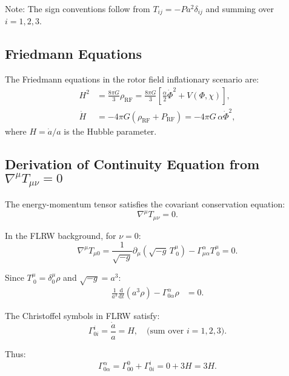 \documentclass[11pt,a4paper]{article}
\numberwithin{equation}{section}
\theoremstyle{plain}
\theoremstyle{definition}
\theoremstyle{remark}
\newcommand{\dd}{\mathrm{d}}
\begin{document}
Note: The sign conventions follow from $T_{ij} = -Pa^2\delta_{ij}$ and summing over $i=1,2,3$.

\subsection{Friedmann Equations}

The Friedmann equations in the rotor field inflationary scenario are:
\begin{align}
H^2 &= \frac{8\pi G}{3}\rho_{\mathrm{RF}} = \frac{8\pi G}{3}\left[\frac{\alpha}{2}\dot{\Phi}^2 + V(\Phi,\chi)\right],\label{eq:friedmann1}\\
\dot{H} &= -4\pi G(\rho_{\mathrm{RF}} + P_{\mathrm{RF}}) = -4\pi G\,\alpha\dot{\Phi}^2,\label{eq:friedmann2}
\end{align}
where $H = \dot{a}/a$ is the Hubble parameter.

\subsection{Derivation of Continuity Equation from $\nabla^\mu T_{\mu\nu} = 0$}

The energy-momentum tensor satisfies the covariant conservation equation:
\begin{equation}
\nabla^\mu T_{\mu\nu} = 0.
\label{eq:covariant-conservation}
\end{equation}

In the FLRW background, for $\nu = 0$:
\begin{equation}
\nabla^\mu T_{\mu 0} = \frac{1}{\sqrt{-g}}\partial_\mu\left(\sqrt{-g}\,T^\mu_{\ 0}\right) - \Gamma^\alpha_{\mu\alpha}T^\mu_{\ 0} = 0.
\end{equation}

Since $T^\mu_{\ 0} = \delta^\mu_0\rho$ and $\sqrt{-g} = a^3$:
\begin{align}
\frac{1}{a^3}\frac{\dd}{\dd t}\left(a^3\rho\right) - \Gamma^\alpha_{0\alpha}\rho &= 0.
\end{align}

The Christoffel symbols in FLRW satisfy:
\begin{equation}
\Gamma^i_{0i} = \frac{\dot{a}}{a} = H,\quad\text{(sum over } i=1,2,3\text{)}.
\end{equation}

Thus:
\begin{equation}
\Gamma^\alpha_{0\alpha} = \Gamma^0_{00} + \Gamma^i_{0i} = 0 + 3H = 3H.
\end{equation}
\end{document}
